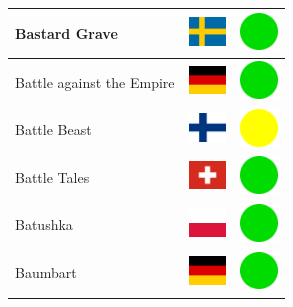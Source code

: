 \documentclass[12pt, a4paper, twoside]{report}
\begin{document}
\begin{center}
\begin{longtable}{|p{5cm}|p{2cm}|p{2cm}|}
 Bastard Grave                                              & \includegraphics[width=1cm]{../4x3/se} &   \includegraphics[width=1cm]{../likes/y} \\ \hline
 Battle against the Empire                                  & \includegraphics[width=1cm]{../4x3/de} &   \includegraphics[width=1cm]{../likes/y} \\ \hline
 Battle Beast                                               & \includegraphics[width=1cm]{../4x3/fi} &   \includegraphics[width=1cm]{../likes/m} \\ \hline
 Battle Tales                                               & \includegraphics[width=1cm]{../4x3/ch} &   \includegraphics[width=1cm]{../likes/y} \\ \hline
 Batushka                                                   & \includegraphics[width=1cm]{../4x3/pl} &   \includegraphics[width=1cm]{../likes/y} \\ \hline
 Baumbart                                                   & \includegraphics[width=1cm]{../4x3/de} &   \includegraphics[width=1cm]{../likes/y} \\ \hline

\end{longtable}
\end{center}
\end{document}
